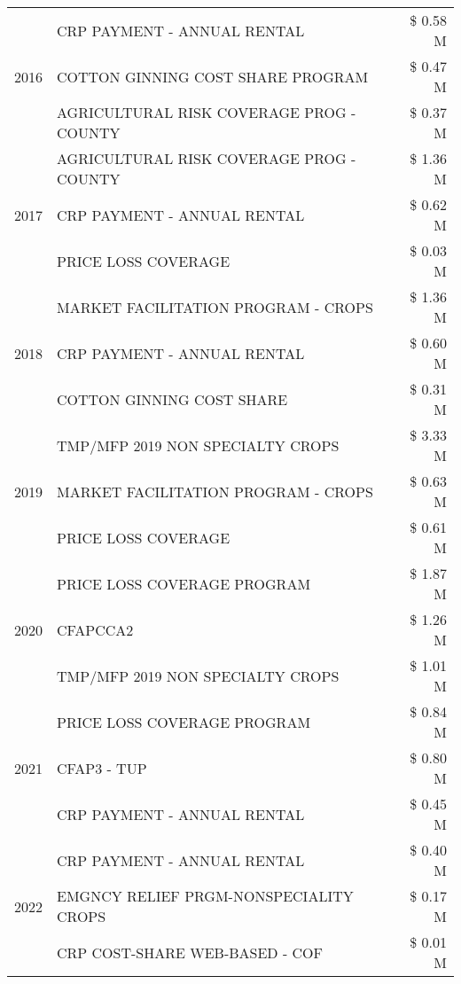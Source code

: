 \begin{tabular}{llr}
\cline{1-3}
\multirow[t]{3}{*}{2016} & CRP PAYMENT - ANNUAL RENTAL & \$ 0.58 M \\
 & COTTON GINNING COST SHARE PROGRAM & \$ 0.47 M \\
 & AGRICULTURAL RISK COVERAGE PROG - COUNTY & \$ 0.37 M \\
\cline{1-3}
\multirow[t]{3}{*}{2017} & AGRICULTURAL RISK COVERAGE PROG - COUNTY & \$ 1.36 M \\
 & CRP PAYMENT - ANNUAL RENTAL & \$ 0.62 M \\
 & PRICE LOSS COVERAGE & \$ 0.03 M \\
\cline{1-3}
\multirow[t]{3}{*}{2018} & MARKET FACILITATION PROGRAM - CROPS & \$ 1.36 M \\
 & CRP PAYMENT - ANNUAL RENTAL & \$ 0.60 M \\
 & COTTON GINNING COST SHARE & \$ 0.31 M \\
\cline{1-3}
\multirow[t]{3}{*}{2019} & TMP/MFP 2019 NON SPECIALTY CROPS & \$ 3.33 M \\
 & MARKET FACILITATION PROGRAM - CROPS & \$ 0.63 M \\
 & PRICE LOSS COVERAGE & \$ 0.61 M \\
\cline{1-3}
\multirow[t]{3}{*}{2020} & PRICE LOSS COVERAGE PROGRAM & \$ 1.87 M \\
 & CFAPCCA2 & \$ 1.26 M \\
 & TMP/MFP 2019 NON SPECIALTY CROPS & \$ 1.01 M \\
\cline{1-3}
\multirow[t]{3}{*}{2021} & PRICE LOSS COVERAGE PROGRAM & \$ 0.84 M \\
 & CFAP3 - TUP & \$ 0.80 M \\
 & CRP PAYMENT - ANNUAL RENTAL & \$ 0.45 M \\
\cline{1-3}
\multirow[t]{3}{*}{2022} & CRP PAYMENT - ANNUAL RENTAL & \$ 0.40 M \\
 & EMGNCY RELIEF PRGM-NONSPECIALITY CROPS & \$ 0.17 M \\
 & CRP COST-SHARE WEB-BASED - COF & \$ 0.01 M \\
\cline{1-3}
\bottomrule
\end{tabular}
